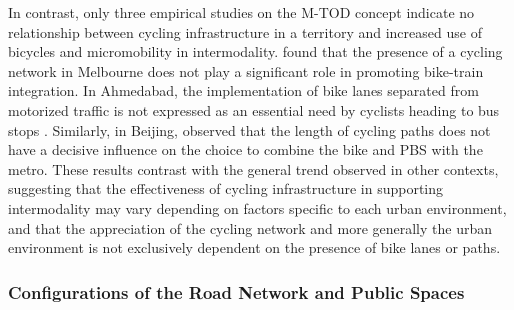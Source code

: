 \begin{refsegment}
In contrast, only three empirical studies on the \acrshort{M-TOD} concept indicate no relationship between cycling infrastructure in a territory and increased use of bicycles and micromobility in intermodality. \textcolor{blue}{\textcite[403]{weliwitiya_bicycle_2019}} found that the presence of a cycling network in Melbourne does not play a significant role in promoting bike-train integration. In Ahmedabad, the implementation of bike lanes separated from motorized traffic is not expressed as an essential need by cyclists heading to bus stops \textcolor{blue}{\autocite[40]{balya_integration_2016}}. Similarly, in Beijing, \textcolor{blue}{\textcite[55]{zhao_bicycle-metro_2017}} observed that the length of cycling paths does not have a decisive influence on the choice to combine the bike and \acrshort{PBS} with the metro. These results contrast with the general trend observed in other contexts, suggesting that the effectiveness of cycling infrastructure in supporting intermodality may vary depending on factors specific to each urban environment, and that the appreciation of the cycling network and more generally the urban environment is not exclusively dependent on the presence of bike lanes or paths.%

\subsubsection*{Configurations of the Road Network and Public Spaces
    \label{chap2:configurations-reseau-viaire-espaces-publics}
}


\end{refsegment}
